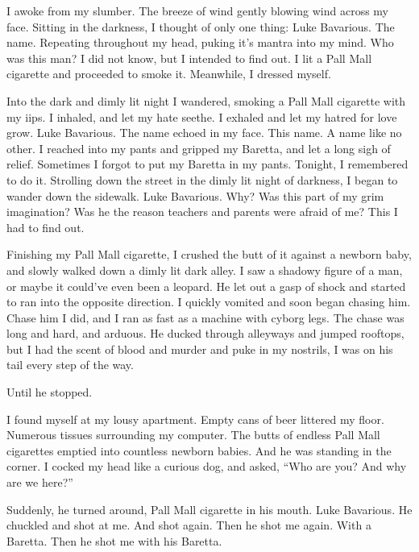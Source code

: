 I awoke from my slumber. The breeze of wind gently blowing wind
across my face. Sitting in the darkness, I thought of only one
thing: Luke Bavarious. The name. Repeating throughout my head,
puking it's mantra into my mind. Who was this man? I did not know,
but I intended to find out. I lit a Pall Mall cigarette and
proceeded to smoke it. Meanwhile, I dressed myself.



Into the dark and dimly lit night I wandered, smoking a Pall Mall
cigarette with my iips. I inhaled, and let my hate seethe. I
exhaled and let my hatred for love grow. Luke Bavarious. The name
echoed in my face. This name. A name like no other. I reached into
my pants and gripped my Baretta, and let a long sigh of relief.
Sometimes I forgot to put my Baretta in my pants. Tonight, I
remembered to do it. Strolling down the street in the dimly lit
night of darkness, I began to wander down the sidewalk. Luke
Bavarious. Why? Was this part of my grim imagination? Was he the
reason teachers and parents were afraid of me? This I had to find
out.



Finishing my Pall Mall cigarette, I crushed the butt of it against
a newborn baby, and slowly walked down a dimly lit dark alley. I
saw a shadowy figure of a man, or maybe it could've even been a
leopard. He let out a gasp of shock and started to ran into the
opposite direction. I quickly vomited and soon began chasing him.
Chase him I did, and I ran as fast as a machine with cyborg legs.
The chase was long and hard, and arduous. He ducked through
alleyways and jumped rooftops, but I had the scent of blood and
murder and puke in my nostrils, I was on his tail every step of the
way.



Until he stopped.







I found myself at my lousy apartment. Empty cans of beer littered
my floor. Numerous tissues surrounding my computer. The butts of
endless Pall Mall cigarettes emptied into countless newborn babies.
And he was standing in the corner. I cocked my head like a curious
dog, and asked, ``Who are you? And why are we here?''



Suddenly, he turned around, Pall Mall cigarette in his mouth. Luke
Bavarious. He chuckled and shot at me. And shot again. Then he shot
me again. With a Baretta. Then he shot me with his Baretta.



